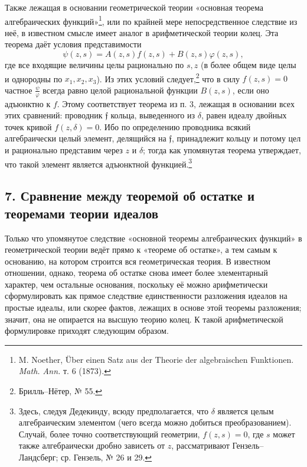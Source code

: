 \documentclass[11pt]{article}
\providecommand{\frf}{\mathfrak f}
\begin{document}
Также лежащая в основании геометрической теории «основная теорема алгебраических функций»\footnote{M. Noether, Über einen Satz aus der Theorie der algebraischen Funktionen. \emph{Math. Ann.} т. 6 (1873).}, или по крайней мере непосредственное следствие из неё, в известном смысле имеет аналог в арифметической теории колец. Эта теорема даёт условия представимости
\[
\psi(z,s)=A(z,s)f(z,s)+B(z,s)\varphi(z,s),
\]
где все входящие величины целы рационально по \(s,z\) (в более общем виде целы и однородны по \(x_1,x_2,x_3\)). Из этих условий следует,\footnote{Брилль--Нётер, № 55.} что в силу \(f(z,s)=0\) частное \(\frac{\psi}{\varphi}\) всегда равно целой рациональной функции \(B(z,s)\), если оно адъюнктно к \(f\). Этому соответствует теорема из п. 3, лежащая в основании всех этих сравнений: проводник \(\frf\) кольца, выведенного из \(\delta\), равен идеалу двойных точек кривой \(f(z,\delta)=0\). Ибо по определению проводника всякий алгебраически целый элемент, делящийся на \(\frf\), принадлежит кольцу и потому цел и рационально представим через \(z\) и \(\delta\); тогда как упомянутая теорема утверждает, что такой элемент является адъюнктной функцией.\footnote{Здесь, следуя Дедекинду, всюду предполагается, что \(\delta\) является целым алгебраическим элементом (чего всегда можно добиться преобразованием). Случай, более точно соответствующий геометрии, \(f(z,s)=0\), где \(s\) может также алгебраически дробно зависеть от \(z\), рассматривают Гензель--Ландсберг; ср. Гензель, № 26 и 29.}

\subsection*{7. Сравнение между теоремой об остатке и теоремами теории идеалов}
Только что упомянутое следствие «основной теоремы алгебраических функций» в геометрической теории ведёт прямо к «теореме об остатке», а тем самым к основанию, на котором строится вся геометрическая теория. В известном отношении, однако, теорема об остатке снова имеет более элементарный характер, чем остальные основания, поскольку её можно арифметически сформулировать как прямое следствие единственности разложения идеалов на простые идеалы, или скорее фактов, лежащих в основе этой теоремы разложения; значит, она не опирается на высшую теорию колец. К такой арифметической формулировке приходят следующим образом.
\end{document}
